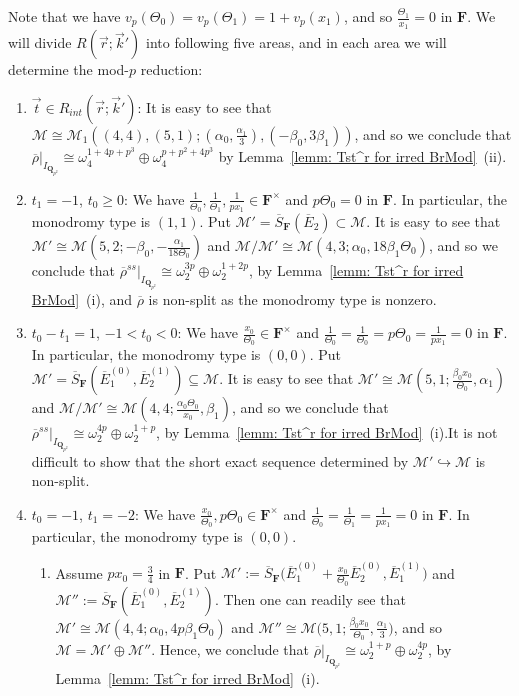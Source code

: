 \documentclass[11pt]{amsart}
\theoremstyle{definition}
\numberwithin{equation}{subsection}
\theoremstyle{plain}
\theoremstyle{plain}
\theoremstyle{plain}
\theoremstyle{plain}
\theoremstyle{plain}
\theoremstyle{plain}
\theoremstyle{plain}
\theoremstyle{plain}
\theoremstyle{plain}
\theoremstyle{plain}
\theoremstyle{plain}
\theoremstyle{plain}
\theoremstyle{definition}
\theoremstyle{definition}
\theoremstyle{definition}
\theoremstyle{remark}
\renewcommand{\(}{\textup{(}}
\renewcommand{\)}{\textup{)}}
\newcommand{\Q}{\mathbf{Q}}
\newcommand{\F}{\mathbf{F}}
\newcommand{\barS}{\overline{S}}
\newcommand{\rhobar}{\overline{\rho}}
\newcommand{\cM}{\mathcal{M}}
\newcommand{\barE}{\overline{E}}
\newcommand{\vr}{\vec{r}}
\newcommand{\vk}{\vec{k}}
\newcommand{\IQptwo}{{I_{\Q_{p^2}}}}
\begin{document}
Note that we have $v_p(\Theta_0)=v_p(\Theta_1)=1+v_p(x_1)$, and so $\frac{\Theta_1}{x_1}=0$ in $\F$. We will divide $R(\vr;\vk')$ into following five areas, and in each area we will determine the mod-$p$ reduction:
\begin{enumerate}[leftmargin=*]
  \item $\vec{t}\in R_{int}(\vr;\vk')$: It is easy to see that $\cM\cong\cM_1((4,4),(5,1);(\alpha_0,\frac{\alpha_1}{3}),(-\beta_0,3\beta_1))$, and so we conclude that $\rhobar|_\IQptwo \cong\omega_4^{1+4p+p^3}\oplus\omega_4^{p+p^2+4p^3}$ by Lemma~\ref{lemm: Tst^r for irred BrMod}~(ii).
  \item $t_1=-1$, $t_0\geq 0$: We have $\frac{1}{\Theta_0},\frac{1}{\Theta_1},\frac{1}{px_1}\in\F^\times$ and $p\Theta_0=0$ in $\F$. In particular, the monodromy type is $(1,1)$. Put $\cM'=\barS_{\F}(\barE_2)\subset\cM$. It is easy to see that $\cM'\cong\cM(5,2;-\beta_0,-\frac{\alpha_1}{18\Theta_0})$ and $\cM/\cM'\cong\cM(4,3;\alpha_0,18\beta_1\Theta_0)$, and so we conclude that $\rhobar^{ss}|_\IQptwo \cong\omega_2^{3p}\oplus\omega_2^{1+2p}$, by Lemma~\ref{lemm: Tst^r for irred BrMod}~(i), and $\rhobar$ is non-split as the monodromy type is nonzero.
  \item $t_0-t_1=1$, $-1<t_0<0$: We have $\frac{x_0}{\Theta_0}\in\F^\times$ and $\frac{1}{\Theta_0}=\frac{1}{\Theta_0}=p\Theta_0=\frac{1}{px_1}=0$ in $\F$. In particular, the monodromy type is $(0,0)$. Put $\cM'=\barS_{\F}(\barE_1^{(0)},\barE_2^{(1)})\subseteq\cM$. It is easy to see that $\cM'\cong\cM(5,1;\frac{\beta_0x_0}{\Theta_0},\alpha_1)$ and $\cM/\cM'\cong\cM(4,4;\frac{\alpha_0\Theta_0}{x_0},\beta_1)$, and so we conclude that $\rhobar^{ss}|_\IQptwo\cong \omega_2^{4p}\oplus\omega_2^{1+p}$, by Lemma~\ref{lemm: Tst^r for irred BrMod}~(i).It is not difficult to show that the short exact sequence determined by $\cM'\hookrightarrow \cM$ is non-split.
  \item $t_0=-1$, $t_1=-2$: We have $\frac{x_0}{\Theta_0},p\Theta_0\in\F^\times$ and $\frac{1}{\Theta_0}=\frac{1}{\Theta_1}=\frac{1}{px_1}=0$ in $\F$. In particular, the monodromy type is $(0,0)$.
     \begin{enumerate}[leftmargin=*]
      \item Assume $px_0=\frac{3}{4}$ in $\F$. Put $\cM':=\barS_{\F}\big(\barE_1^{(0)}+\frac{x_0}{\Theta_0}\barE_2^{(0)},\barE_1^{(1)}\big)$ and $\cM'':=\barS_{\F}(\barE_1^{(0)},\barE_2^{(1)})$. Then one can readily see that
          $\cM'\cong\cM(4,4;\alpha_0,4p\beta_1\Theta_0)$ and $\cM''\cong\cM\big(5,1;\frac{\beta_0x_0}{\Theta_0}, \frac{\alpha_1}{3}\big)$, and so $\cM=\cM'\oplus\cM''$. Hence, we conclude that $\rhobar|_\IQptwo\cong\omega_2^{1+p}\oplus\omega_2^{4p}$, by Lemma~\ref{lemm: Tst^r for irred BrMod}~(i).

\end{enumerate}
\end{enumerate}
\end{document}
